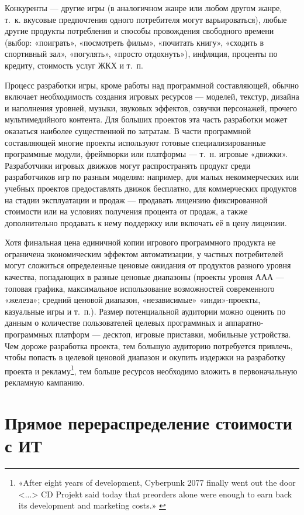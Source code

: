 \documentclass{article}
\begin{document}
Конкуренты — другие игры (в аналогичном жанре или любом другом жанре, т.~к. вкусовые предпочтения одного потребителя могут варьироваться), любые другие продукты потребления и способы провождения свободного времени (выбор: «поиграть», «посмотреть фильм», «почитать книгу», «сходить в спортивный зал», «погулять», «просто отдохнуть»), инфляция, проценты по кредиту, стоимость услуг ЖКХ и т.~п.

Процесс разработки игры, кроме работы над программной составляющей, обычно включает необходимость создания игровых ресурсов — моделей, текстур, дизайна и наполнения уровней, музыки, звуковых эффектов, озвучки персонажей, прочего мультимедийного контента. Для больших проектов эта часть разработки может оказаться наиболее существенной по затратам. В части программной составляющей многие проекты используют готовые специализированные программные модули, фреймворки или платформы — т.~н. игровые «движки». Разработчики игровых движков могут распространять продукт среди разработчиков игр по разным моделям: например, для малых некоммерческих или учебных проектов предоставлять движок бесплатно, для коммерческих продуктов на стадии эксплуатации и продаж — продавать лицензию фиксированной стоимости или на условиях получения процента от продаж, а также дополнительно продавать к нему поддержку или включать её в цену лицензии.

Хотя финальная цена единичной копии игрового программного продукта не ограничена экономическим эффектом автоматизации, у частных потребителей могут сложиться определенные ценовые ожидания от продуктов разного уровня качества, попадающих в разные ценовые диапазоны (проекты уровня ААА — топовая графика, максимальное использование возможностей современного «железа»; средний ценовой диапазон, «независимые» «инди»-проекты, казуальные игры и т.~п.). Размер потенциальной аудитории можно оценить по данным о количестве пользователей целевых программных и аппаратно-программных платформ — десктоп, игровые приставки, мобильные устройства. Чем дороже разработка проекта, тем большую аудиторию потребуется привлечь, чтобы попасть в целевой ценовой диапазон и окупить издержки на разработку проекта и рекламу\footnote{«After eight years of development, Cyberpunk 2077 finally went out the door <...> CD Projekt said today that preorders alone were enough to earn back its development and marketing costs.» \cite{cyberpunkProfit}}, тем больше ресурсов необходимо вложить в первоначальную рекламную кампанию.

\section*{Прямое перераспределение стоимости с ИТ}
\end{document}
